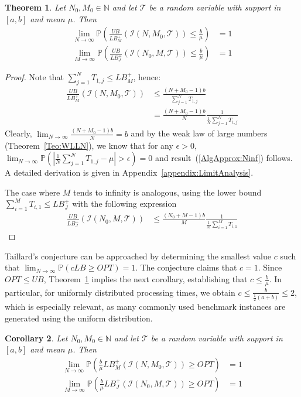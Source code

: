 \documentclass{article}
\theoremstyle{thmstyleone}%
\newtheorem{theorem}{Theorem}%
\newtheorem{corollary}[theorem]{Corollary}%
\theoremstyle{thmstyletwo}%
\theoremstyle{thmstylethree}%
\begin{document}
\begin{theorem}
\label{Teo:AsymptoticRatio}
Let $N_0, M_0 \in \mathbb{N}$ and let $\mathcal{T}$ be a random variable with support in $[a,b]$ and mean $\mu$. Then 
\begin{align}
\lim_{N \to \infty} \mathbb{P} \left( \frac{UB}{LB_M^+}( \mathcal{I}(N, M_0, \mathcal{T}) ) \leq \frac{b}{\mu} \right) &= 1\\
\lim_{M \to \infty} \mathbb{P} \left( \frac{UB}{LB_J^+}( \mathcal{I}(N_0, M, \mathcal{T}) ) \leq \frac{b}{\mu} \right) &= 1
\end{align}
\end{theorem}
\begin{proof}
Note that $\sum_{j=1}^N T_{1,j} \leq LB_M^+$, hence:
\begin{align*}
    \frac{UB}{LB_M^+}( \mathcal{I}(N, M_0, \mathcal{T}) )  &\leq \frac{ (N + M_0 - 1)b }{ \sum_{j=1}^N T_{1,j} }\\
    &= \frac{ (N + M_0 - 1)b }{ N } \frac{ 1 }{ \frac{1}{N} \sum_{j=1}^N T_{1,j} }
\end{align*}
Clearly, $\lim_{N \to \infty} \frac{(N + M_0 - 1)b}{N} = b$ and by the weak law of large numbers (Theorem~\ref{Teo:WLLN}), we know that for any $\epsilon > 0$,
$\lim_{N \to \infty} \mathbb{P}(| \frac{1}{N} \sum_{j=1}^N T_{1,j} - \mu| > \epsilon) = 0$ and result~(\ref{AlgApprox:Ninf}) follows. A detailed derivation is given in Appendix~\ref{appendix:LimitAnalysis}. 

The case where $M$ tends to infinity is analogous, using the lower bound $\sum_{i=1}^M T_{i, 1} \leq LB_J^+$ with the following expression
\begin{align*}
   \frac{UB}{LB_J^+}( \mathcal{I}(N_0, M, \mathcal{T}) ) &\leq \frac{ (N_0 + M - 1)b }{ M } \frac{ 1 }{ \frac{1}{M} \sum_{i=1}^M T_{i, 1}  }
\end{align*}
\end{proof}

Taillard's conjecture can be approached by determining the smallest value $c$ such that $\lim_{N \to \infty} \mathbb{P}(cLB \geq OPT) = 1$. 
The conjecture claims that $c = 1$. 
Since $OPT \leq UB$, Theorem~\ref{Teo:AsymptoticRatio} implies the next corollary, 
establishing that $c \leq \frac{b}{\mu}$. 
In particular, for uniformly distributed processing times, we obtain $c \leq \frac{b}{\frac{1}{2}(a + b)} \leq 2$, which is especially relevant, as many commonly used benchmark instances are generated using the uniform distribution. 

\begin{corollary}
Let $N_0, M_0 \in \mathbb{N}$ and let $\mathcal{T}$ be a random variable with support in $[a,b]$ and mean $\mu$. Then
\begin{align*}
\lim_{N \to \infty} \mathbb{P}\left(\frac{b}{\mu} LB_M^+ (\mathcal{I}(N, M_0, \mathcal{T})) \geq OPT \right) &= 1\\
\lim_{M \to \infty} \mathbb{P}\left(\frac{b}{\mu} LB_J^+ (\mathcal{I}(N_0, M, \mathcal{T})) \geq OPT \right) &= 1\\
\end{align*}
\end{corollary}
\end{document}
